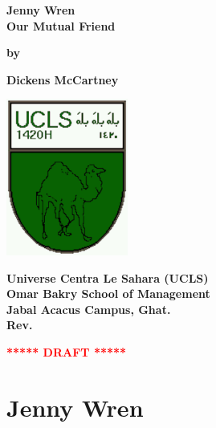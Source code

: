 \documentclass[12pt]{book}
\newcommand{\pengarangs}{%
    Dickens McCartney\\
}
\newcommand{\judul}{%
Jenny Wren\\[13pt]
Our Mutual Friend
}
\begin{document}
\begin{titlepage}
    \begin{center}    

    \vspace*{15mm}
    \textbf{\Large \judul}

    \vspace*{30mm}       
    \textbf{by}

    \vspace*{15mm}    
    \textbf{\Large \pengarangs}

    \vspace*{4.0cm}

    \begin{center}
        \includegraphics[width=40mm]{ucls-coat}
    \end{center}

    \textbf{
       Universe Centra Le Sahara (UCLS)\\[11pt]
       Omar Bakry School of Management\\[11pt]
       Jabal Acacus Campus, Ghat. \\[11pt]
       Rev. \rev%
    }

    \vspace*{5mm}    
    \textbf{\LARGE \textcolor{red}{***** DRAFT *****}}

    \end{center}

\end{titlepage}


\tableofcontents

\newpage

\chapter*{Jenny Wren}
\end{document}
